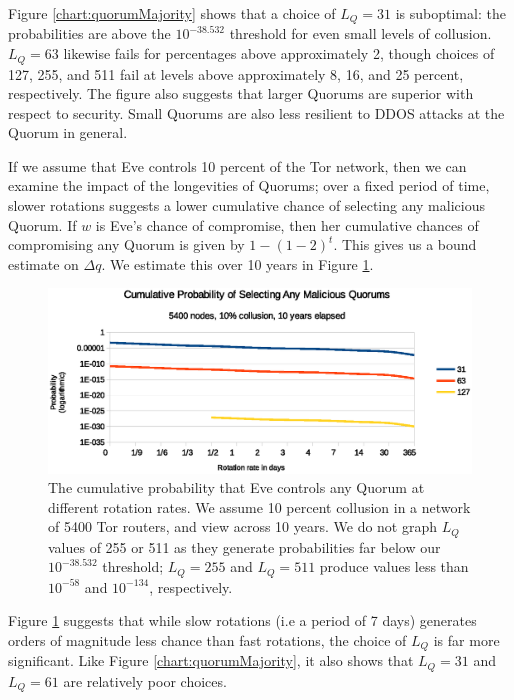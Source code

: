 Figure \ref{chart:quorumMajority} shows that a choice of $ L_{Q} = 31 $ is suboptimal: the probabilities are above the $ 10^{-38.532} $ threshold for even small levels of collusion. $ L_{Q} = 63 $ likewise fails for percentages above approximately 2, though choices of 127, 255, and 511 fail at levels above approximately 8, 16, and 25 percent, respectively. The figure also suggests that larger Quorums are superior with respect to security. Small Quorums are also less resilient to DDOS attacks at the Quorum in general.

If we assume that Eve controls 10 percent of the Tor network, then we can examine the impact of the longevities of Quorums; over a fixed period of time, slower rotations suggests a lower cumulative chance of selecting any malicious Quorum. If $ w $ is Eve's chance of compromise, then her cumulative chances of compromising any Quorum is given by $ 1 - (1-2)^t $. This gives us a bound estimate on $ \Delta q $. We estimate this over 10 years in Figure \ref{chart:cumulativeProbability}.

\begin{figure}[htbp]
	\centering
	\includegraphics[width=1\textwidth]{analysis/CumulativeMaliciousQuorum.eps}
	\caption{The cumulative probability that Eve controls any Quorum at different rotation rates. We assume 10 percent collusion in a network of 5400 Tor routers, and view across 10 years. We do not graph $ L_{Q} $ values of 255 or 511 as they generate probabilities far below our $ 10^{-38.532} $ threshold; $ L_{Q} = 255 $ and $ L_{Q} = 511 $ produce values less than $ 10^{-58} $ and $ 10^{-134} $, respectively.}
	\label{chart:cumulativeProbability}
\end{figure}

Figure \ref{chart:cumulativeProbability} suggests that while slow rotations (i.e a period of 7 days) generates orders of magnitude less chance than fast rotations, the choice of $ L_{Q} $ is far more significant. Like Figure \ref{chart:quorumMajority}, it also shows that $ L_{Q} = 31 $ and $ L_{Q} = 61 $ are relatively poor choices.

